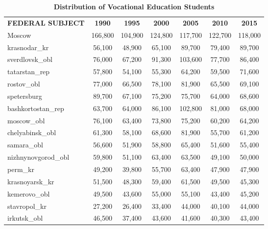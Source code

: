 \documentclass[alpha-refs,fleqn]{wiley-article_p2}
\begin{document}
\setcounter{table}{0} 
\renewcommand{\thetable}{A\arabic{table}}
\smaller
\begin{table}[h]
\caption{\textbf{Distribution of Vocational Education Students}}\label{table:a1}
\begin{threeparttable}
\setlength{\tabcolsep}{5pt}
\renewcommand{\arraystretch}{1.25}
\begin{tabular}{p{5.5cm}cccccc}
\rowcolor{grey!30} 
\textbf{FEDERAL SUBJECT}	&	\textbf{1990}	&	\textbf{1995}	&	\textbf{2000}	&	\textbf{2005}	&	\textbf{2010}	&	\textbf{2015} 	\\
\rowcolor{pink!20}
Moscow	&	166,800	&	104,900	&	124,800	&	117,700	&	122,700	&	118,000	\\
\rowcolor{blue!20}
krasnodar\_kr	&	56,100	&	48,900	&	65,100	&	89,700	&	79,400	&	89,700	\\
\rowcolor{blue!20}
sverdlovsk\_obl	&	76,000	&	67,200	&	91,300	&	103,600	&	77,700	&	86,400	\\
\rowcolor{blue!20}
tatarstan\_rep	&	57,800	&	54,100	&	55,300	&	64,200	&	59,500	&	71,600	\\
\rowcolor{pink!20}
rostov\_obl	&	77,000	&	66,500	&	78,100	&	81,900	&	65,500	&	69,100	\\
\rowcolor{pink!20}
spetersburg	&	89,700	&	67,100	&	75,200	&	75,700	&	64,000	&	68,600	\\
\rowcolor{blue!20}
bashkortostan\_rep	&	63,700	&	64,000	&	86,100	&	102,800	&	81,000	&	68,000	\\
\rowcolor{pink!20}
moscow\_obl	&	76,100	&	63,400	&	73,800	&	75,200	&	60,200	&	64,200	\\
chelyabinsk\_obl	&	61,300	&	58,100	&	68,600	&	81,900	&	55,700	&	61,200	\\
samara\_obl	&	56,600	&	51,900	&	58,800	&	65,400	&	51,600	&	55,400	\\
\rowcolor{pink!20}
nizhnynovgorod\_obl	&	59,800	&	51,100	&	63,400	&	63,500	&	49,100	&	50,000	\\
perm\_kr	&	49,200	&	39,800	&	55,700	&	63,400	&	47,900	&	47,900	\\
krasnoyarsk\_kr	&	51,500	&	48,300	&	59,400	&	61,500	&	49,500	&	45,300	\\
kemerovo\_obl	&	49,500	&	43,600	&	55,000	&	55,100	&	43,400	&	45,200	\\
\rowcolor{blue!20}
stavropol\_kr	&	27,200	&	26,400	&	33,400	&	44,000	&	40,100	&	44,000	\\
irkutsk\_obl	&	46,500	&	37,400	&	43,600	&	41,600	&	40,300	&	43,400	\\

\end{tabular}
\end{threeparttable}
\end{table}
\end{document}

